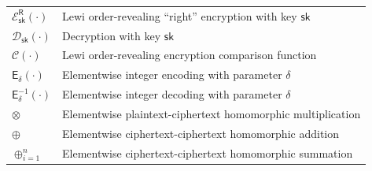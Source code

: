 \documentclass[oneside]{scrbook}
\theoremstyle{definition}
\theoremstyle{definition}
\theoremstyle{remark}
\begin{document}
\begin{longtable}{p{}p{}}
    $\mathcal{E}^{\mathsf{R}}_{\mathsf{sk}}(\cdot)$ & Lewi order-revealing ``right'' encryption with key $\mathsf{sk}$\\
    $\mathcal{D}_{\mathsf{sk}}(\cdot)$ & Decryption with key $\mathsf{sk}$\\
    $\mathcal{C}(\cdot)$ & Lewi order-revealing encryption comparison function\\
    $\mathsf{E}_{\delta}(\cdot)$ & Elementwise integer encoding with parameter $\delta$\\
    $\mathsf{E}_{\delta}^{-1}(\cdot)$ & Elementwise integer decoding with parameter $\delta$\\
    $\otimes$ & Elementwise plaintext-ciphertext homomorphic multiplication\\
    $\oplus$ & Elementwise ciphertext-ciphertext homomorphic addition\\
    $\oplus_{i=1}^n$ & Elementwise ciphertext-ciphertext homomorphic summation\\
\end{longtable}
\end{document}
